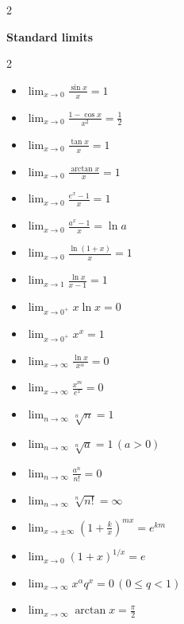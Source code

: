 \begin{multicols}{2}
{\vspace{2pt}
\textbf{\sffamily\color{subText}Standard limits}
\begin{multicols}{2}
\begin{itemize}[noitemsep,topsep=0pt,leftmargin=*]
\item $\lim_{x\to0}\frac{\sin x}{x}=1$
\item $\lim_{x\to0}\frac{1-\cos x}{x^2}=\frac12$
\item $\lim_{x\to0}\frac{\tan x}{x}=1$
\item $\lim_{x\to0}\frac{\arctan x}{x}=1$
\item $\lim_{x\to0}\frac{e^x-1}{x}=1$
\item $\lim_{x\to0}\frac{a^x-1}{x}=\ln a$
\item $\lim_{x\to0}\frac{\ln(1+x)}{x}=1$
\item $\lim_{x\to1}\frac{\ln x}{x-1}=1$
\item $\lim_{x\to0^+}x\ln x=0$
\item $\lim_{x\to0^+}x^x=1$
\item $\lim_{x\to\infty}\frac{\ln x}{x^\alpha}=0$
\item $\lim_{x\to\infty}\frac{x^m}{e^x}=0$
\item $\lim_{n\to\infty}\sqrt[n]{n}=1$
\item $\lim_{n\to\infty}\sqrt[n]{a}=1\,(a>0)$
\item $\lim_{n\to\infty}\frac{a^n}{n!}=0$
\item $\lim_{n\to\infty}\sqrt[n]{n!}=\infty$
\item $\lim_{x\to\pm\infty}(1+\frac kx)^{mx}=e^{km}$
\item $\lim_{x\to0}(1+x)^{1/x}=e$
\item $\lim_{x\to\infty}x^\alpha q^x=0\,(0\le q<1)$
\item $\lim_{x\to\infty}\arctan x=\frac\pi2$
\end{itemize}
\end{multicols}
}
\end{multicols}

